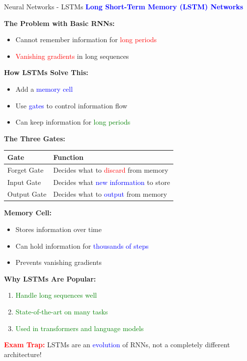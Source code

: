 \documentclass[8pt]{beamer}
\begin{document}
	\begin{frame}{Neural Networks - LSTMs}
		\fontsize{6.5}{7.5}\selectfont
		\textcolor{blue}{\textbf{Long Short-Term Memory (LSTM) Networks}}
		
		\textbf{The Problem with Basic RNNs:}
		\begin{itemize}
			\item Cannot remember information for \textcolor{red}{long periods}
			\item \textcolor{red}{Vanishing gradients} in long sequences
		\end{itemize}
		
		\textbf{How LSTMs Solve This:}
		\begin{itemize}
			\item Add a \textcolor{blue}{memory cell}
			\item Use \textcolor{blue}{gates} to control information flow
			\item Can keep information for \textcolor{green}{long periods}
		\end{itemize}
		
		\textbf{The Three Gates:}
		
		\begin{tabular}{|p{3cm}|p{5cm}|}
			\hline
			\textbf{Gate} & \textbf{Function} \\
			\hline
			Forget Gate & Decides what to \textcolor{red}{discard} from memory \\
			\hline
			Input Gate & Decides what \textcolor{blue}{new information} to store \\
			\hline
			Output Gate & Decides what to \textcolor{blue}{output} from memory \\
			\hline
		\end{tabular}
		
		\textbf{Memory Cell:}
		\begin{itemize}
			\item Stores information over time
			\item Can hold information for \textcolor{blue}{thousands of steps}
			\item Prevents vanishing gradients
		\end{itemize}
		
		\textbf{Why LSTMs Are Popular:}
		\begin{enumerate}
			\item \textcolor{green}{Handle long sequences well}
			\item \textcolor{green}{State-of-the-art on many tasks}
			\item \textcolor{green}{Used in transformers and language models}
		\end{enumerate}
		
		\textcolor{red}{\textbf{Exam Trap:}} LSTMs are an \textcolor{blue}{evolution} of RNNs, not a completely different architecture!
	\end{frame}
	
\end{document}
